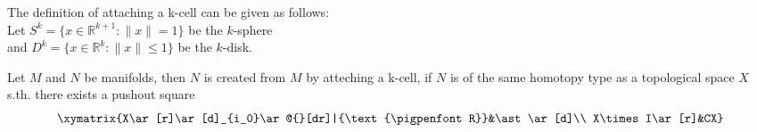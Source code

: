 \documentclass{article}
\makeatletter
\newcommand{\po}{\ar@{}[dr]|{\text{\pigpenfont R}}}
\makeatother
\begin{document}
The definition of attaching a k-cell can be given as follows: \\
Let $S^k = \{x \in \mathbb{R}^{k+1} : \lVert x \rVert = 1\}$ be the $k$-sphere \\
and $D^k = \{ x \in \mathbb{R}^k : \lVert x \rVert \leq 1 \}$ be the $k$-disk.

Let $M$ and $N$ be manifolds, then $N$ is created from $M$ by atteching a k-cell,
if $N$ is of the same homotopy type as a topological space $X$ s.th. there exists 
a pushout square
\[
   \xymatrix{X\ar[r]\ar[d]_{i_0}\po &\ast\ar[d]\\
      X\times I\ar[r]&CX}
\]
\end{document}
